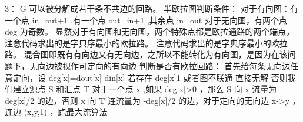 {}3：\markdownRendererDollarSign{} G \markdownRendererDollarSign{}可以被分解成若干条不共边的回路。\markdownRendererParagraphSeparator
{}半欧拉图判断条件：\markdownRendererParagraphSeparator
{}对于有向图：有一个点\markdownRendererDollarSign{} in=out+1 \markdownRendererDollarSign{},有一个点\markdownRendererDollarSign{} out=in+1 \markdownRendererDollarSign{},其余点\markdownRendererDollarSign{} in=out \markdownRendererDollarSign{}\markdownRendererParagraphSeparator
{}对于无向图，有两个点\markdownRendererDollarSign{} deg \markdownRendererDollarSign{}为奇数。\markdownRendererParagraphSeparator
{}显然对于有向图和无向图，两个特殊点都是欧拉通路的两个端点。\markdownRendererInterblockSeparator
{}\markdownRendererSectionBegin
{}\markdownRendererInterblockSeparator
{}注意代码求出的是字典序最小的欧拉路。\markdownRendererInterblockSeparator
{}\markdownRendererInterblockSeparator
{}
\markdownRendererSectionEnd \markdownRendererSectionBegin
{}\markdownRendererInterblockSeparator
{}注意代码求出的是字典序最小的欧拉路。\markdownRendererInterblockSeparator
{}\markdownRendererInterblockSeparator
{}
\markdownRendererSectionEnd \markdownRendererSectionBegin
{}\markdownRendererInterblockSeparator
{}混合图即既有有向边又有无向边，之所以不能转化为有向图，是因为在该问题下，无向边被视作可定向的有向边\markdownRendererParagraphSeparator
{}判断是否有欧拉回路：\markdownRendererParagraphSeparator
{}首先给每条无向边任意定向，设\markdownRendererDollarSign{} deg[x]=dout[x]-din[x] \markdownRendererDollarSign{}\markdownRendererParagraphSeparator
{}若存在\markdownRendererDollarSign{} deg[x]\markdownRendererAmpersand{}1 \markdownRendererDollarSign{}或者图不联通 直接无解\markdownRendererParagraphSeparator
{}否则我们建立源点\markdownRendererDollarSign{} S \markdownRendererDollarSign{}和汇点\markdownRendererDollarSign{} T \markdownRendererDollarSign{}\markdownRendererParagraphSeparator
{}对于一个点\markdownRendererDollarSign{} x \markdownRendererDollarSign{},如果\markdownRendererDollarSign{} deg[x]>0 \markdownRendererDollarSign{}，那么\markdownRendererDollarSign{} S \markdownRendererDollarSign{}向\markdownRendererDollarSign{} x \markdownRendererDollarSign{}流量为\markdownRendererDollarSign{} deg[x]/2 \markdownRendererDollarSign{}的边，否则\markdownRendererDollarSign{} x \markdownRendererDollarSign{}向\markdownRendererDollarSign{} T \markdownRendererDollarSign{}连流量为\markdownRendererDollarSign{} -deg[x]/2 \markdownRendererDollarSign{}的边，对于定向的无向边\markdownRendererDollarSign{} x->y \markdownRendererDollarSign{}，连边\markdownRendererDollarSign{} (x,y,1) \markdownRendererDollarSign{}，跑最大流算法\markdownRendererParagraphSeparator

